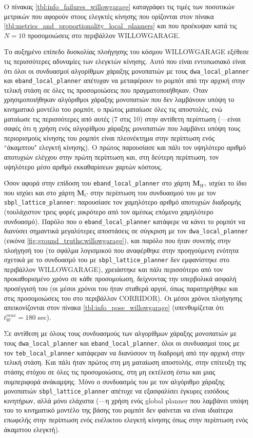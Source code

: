 O πίνακας \ref{tbl:info_failures_willowgarage} καταγράφει τις τιμές των
ποσοτικών μετρικών που αφορούν στους ελεγκτές κίνησης που ορίζονται στον πίνακα
\ref{tbl:metrics_and_proportionality_local_planners} και που προέκυψαν κατά τις
$N = 10$ προσομοιώσεις στο περιβάλλον WILLOWGARAGE.

Το αυξημένο επίπεδο δυσκολίας πλοήγησης του κόσμου WILLOWGARAGE εξέθεσε τις
περισσότερες αδυναμίες των ελεγκτών κίνησης. Αυτό που είναι εντυπωσιακό είναι
ότι όλοι οι συνδυασμοί αλγορίθμων χάραξης μονοπατιών με τους
\texttt{dwa\_local\_planner} και \texttt{eband\_local\_planner} απέτυχαν να
μεταφέρουν το ρομπότ από την αρχική στην τελική στάση σε όλες τις
προσομοιώσεις που πραγματοποιήθηκαν.  Όταν χρησιμοποιήθηκαν αλγόριθμοι χάραξης
μονοπατιών που δεν λαμβάνουν υπόψη το κινηματικό μοντέλο του ρομπότ, ο πρώτος
ματαίωσε όλες τις αποστολές, ενώ ματαίωσε τις περισσότερες από αυτές (7 στις
10) στην αντίθετη περίπτωση (---είναι σαφές ότι η χρήση ενός αλγορίθμου χάραξης
μονοπατιών που λαμβάνει υπόψη τους περιορισμούς κίνησης του ρομπότ είναι
πλεονέκτημα στην περίπτωση ενός ``άκαμπτου" ελεγκτή κίνησης). Ο πρώτος
παρουσίασε και πάλι τον υψηλότερο αριθμό αποτυχιών ελέγχου στην πρώτη περίπτωση
και, στη δεύτερη περίπτωση, τον υψηλότερο μέσο αριθμό εκκαθαρίσεων χαρτών
κόστους.

Όσον αφορά στην επίδοση του \texttt{eband\_local\_planner} στο χάρτη
$\bm{M}_W$, ισχύει το ίδιο που ισχύει και στο χάρτη $\bm{M}_C$ στην περίπτωση
του συνδυασμού του με τον \texttt{sbpl\_lattice\_planner}: παρουσίασε τον
χαμηλότερο αριθμό αποτυχιών διαδρομής (τουλάχιστον τρεις φορές μικρότερο από
τον αμέσως επόμενο χαμηλότερο συνδυασμό). Παρόλο που ο
\texttt{eband\_local\_planner} κατάφερε να κάνει το ρομπότ να διανύσει
σημαντικά μεγαλύτερες αποστάσεις σε σύγκριση με τον
\texttt{dwa\_local\_planner} (εικόνα \ref{fig:ground_truths:willowgarage}), και
παρόλο που ήταν συνεπής στην πλοήγησή του (το σφάλμα λογισμικού που αναφέρθηκε
στην προηγούμενη ενότητα σχετικά με το συνδυασμό του με
\texttt{sbpl\_lattice\_planner} δεν εμφανίστηκε στο περιβάλλον WILLOWGARAGE),
χρειάστηκε και πάλι περισσότερο από τον προκαθορισμένο χρόνο σε κάθε
προσομοίωση, δείχνοντας την υπερβολικά ασφαλή προσέγγισή του (οι μέσοι χρόνοι
του ήταν σταθερά αργοί, όπως παρατηρήθηκε και στις προσομοιώσεις του στο
περιβάλλον CORRIDOR). Οι μέσοι χρόνοι πλοήγησης απεικονίζονται στον πίνακα
\ref{tbl:info_pose_willowgarage} (υπενθυμίζεται ότι $t_W^{max} = 180$ sec).

Σε αντίθεση με όλους τους συνδυασμούς των αλγορίθμων χάραξης μονοπατιών με τους
\texttt{dwa\_local\_planner} και \texttt{eband\_local\_planner}, όλοι οι
συνδυασμοί τους με τον \texttt{teb\_local\_planner} κατάφεραν να διανύσουν τη
διαδρομή από την αρχική στην τελική στάση. Και πάλι ήταν πρώτος στη μη
ματαίωση αποστολής, στην επίτευξη της στάσης στόχου σε όλες τις προσομοιώσεις,
στη μη εκτέλεση έστω και μιας συμπεριφορά ανάκαμψης. Μόνο ο συνδυασμός του με
τον αλγόριθμο χάραξης μονοπατιών \texttt{sbpl\_lattice\_planner} απέτυχε να
εξασφαλίσει έγκυρες εισόδους κινητήρων, αλλά μόνο ελάχιστα (---η χρήση ενός
global planner που λαμβάνει υπόψη του το κινηματικό μοντέλο της βάσης του
ρομπότ δεν φαίνεται να είναι ιδιαίτερα επωφελής στην περίπτωση ενός ευέλικτου
ελεγκτή κίνησης όπως στην περίπτωση ενός άκαμπτου ελεγκτή).

